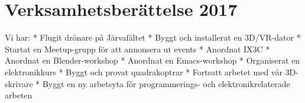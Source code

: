 \documentclass[a4paper,11pt,oneside]{article}
\begin{document}
\section{Verksamhetsberättelse 2017}

Vi har:
* Flugit drönare på Järvafältet
* Byggt och installerat en 3D/VR-dator 
* Startat en Meetup-grupp för att annonsera ut events
* Anordnat IX3C
* Anordnat en Blender-workshop
* Anordnat en Emacs-workshop
* Organiserat en elektronikkurs
* Byggt och provat quadrakoptrar
* Fortsatt arbetet med vår 3D-skrivare
* Byggt en ny arbetsyta för programmerings- och elektronikrelaterade arbeten
\end{document}
